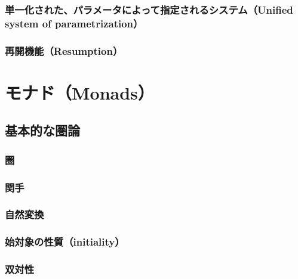\documentclass[11pt, oneside]{jsarticle}   	%
\begin{document}












\subsubsection{単一化された、パラメータによって指定されるシステム（Unified system of parametrization）}
\subsubsection{再開機能（Resumption）}

\newpage
\section{ モナド（Monads）}
\subsection{基本的な圏論}
\subsubsection{ 圏 }
\subsubsection{ 関手 }
\subsubsection{ 自然変換 }
\subsubsection{ 始対象の性質（initiality）}
\subsubsection{ 双対性 }
\end{document}
